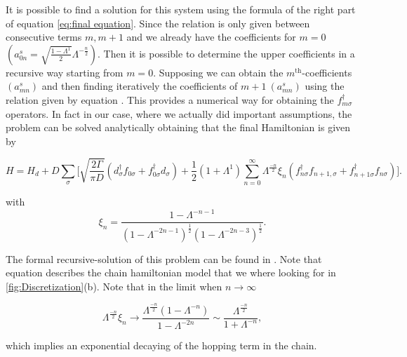 It is possible to find a solution for this system using the formula of
the right part of equation \ref{eq:final equation}. Since the relation
is only given between consecutive terms $m,m+1$ and we already have
the coefficients for $m=0$ $\left(a_{0n}^{s}=\sqrt{\frac{1-\Lambda^{1}}{2}}\Lambda^{-\frac{n}{2}}\right).$
Then it is possible to determine the upper coefficients in a recursive way starting
from $m=0$. Supposing we can obtain the $m^{\mbox{th}}$-coefficients
$(a_{mn}^{s})$ and then finding iteratively the coefficients of $m+1\ (a_{mn}^{s})$
using the relation given by equation .
This provides a numerical way for obtaining the $f_{m\sigma}^{\dagger}$
operators. In fact in our case, where we actually did important assumptions,
the problem can be solved analytically obtaining that the final Hamiltonian
is given by 

\begin{equation}
H=H_{d}+D\sum_{\sigma}\Biggl[\sqrt{\frac{2\Gamma}{\pi D}}\left(d_{\sigma}^{\dagger}f_{0\sigma}+f_{0\sigma}^{\dagger}d_{\sigma}\right)+\frac{1}{2}\left(1+\Lambda^{1}\right)\sum_{n=0}^{\infty}\Lambda^{\frac{-n}{2}}\xi_{n}\left(f_{n\sigma}^{\dagger}f_{n+1,\sigma}+f_{n+1\sigma}^{\dagger}f_{n\sigma}\right)\Biggr].\label{eq:chain-Hamiltonian}
\end{equation}


with 
\[
\xi_{n}=\frac{1-\Lambda^{-n-1}}{\left(1-\Lambda^{-2n-1}\right)^{\frac{1}{2}}\left(1-\Lambda^{-2n-3}\right)^{\frac{1}{2}}}.
\]


The formal recursive-solution of this problem can be found in \citep{bulla_numerical_2008}
. Note that equation  describes the
chain hamiltonian model that we where looking for in \ref{fig:Discretization}(b).
Note that in the limit when $n\longrightarrow\infty$ 

\[
\Lambda^{\frac{-n}{2}}\xi_{n}\longrightarrow\frac{\Lambda^{\frac{-n}{2}}\left(1-\Lambda^{-n}\right)}{1-\Lambda^{-2n}}\sim\frac{\Lambda^{\frac{-n}{2}}}{1+\Lambda^{-n}},
\]


which implies an exponential decaying of the hopping term in the chain. 





